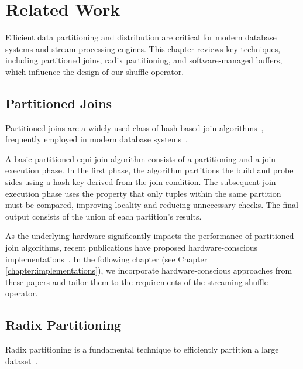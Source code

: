 
\chapter{Related Work}\label{chapter:related_work}\acresetall
Efficient data partitioning and distribution are critical for modern database systems and stream processing engines.
This chapter reviews key techniques, including partitioned joins, radix partitioning, and software-managed buffers, which influence the design of our shuffle operator.

\section{Partitioned Joins}\label{sec-rw-partitioning-joins}
Partitioned joins are a widely used class of hash-based join algorithms~\parencite{joins-real-system, hash-joins-hardware-tuning, equi-join-comparison}, frequently employed in modern database systems~\parencite{umbra, hyper, hyper-compilation}.

A basic partitioned equi-join algorithm consists of a partitioning and a join execution phase.
In the first phase, the algorithm partitions the build and probe sides using a hash key derived from the join condition.
The subsequent join execution phase uses the property that only tuples within the same partition must be compared, improving locality and reducing unnecessary checks.
The final output consists of the union of each partition’s results.

As the underlying hardware significantly impacts the performance of partitioned join algorithms, recent publications have proposed hardware-conscious implementations~\parencite{hash-joins-hardware-tuning, radix-partitioning-case, main-memory-partitioning, data-partitioning-in-memory-systems}.
In the following chapter (see Chapter \ref{chapter:implementations}), we incorporate hardware-conscious approaches from these papers and tailor them to the requirements of the streaming shuffle operator.

\section{Radix Partitioning}\label{sec-rw-radix-partitioning}
Radix partitioning is a fundamental technique to efficiently partition a large dataset~\parencite{radix-partitioning, radix-partitioning-case, data-partitioning-in-memory-systems, partitioned-parallel-radix-sort}.


